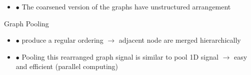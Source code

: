 \documentclass[8pt]{beamer}
\begin{document}
\begin{frame}
\begin{itemize}
	\item[] $\bullet$ The coarsened version of the graphs have unstructured arrangement  
 \end{itemize}
 \begin{algorithm}[H]
\caption{Graph Pooling}
\small
\begin{algorithmic}[1]
\small 
{}
\end{algorithmic}
\end{algorithm}

 \begin{itemize}
  \item[] $\bullet$ produce a regular ordering $ \rightarrow $ adjacent node are merged hierarchically  
  \item[] $\bullet$ Pooling this rearranged graph signal is similar to pool 1D signal $ \rightarrow $ easy and efficient (parallel computing)  
 \end{itemize}
\end{frame}

\end{document}
